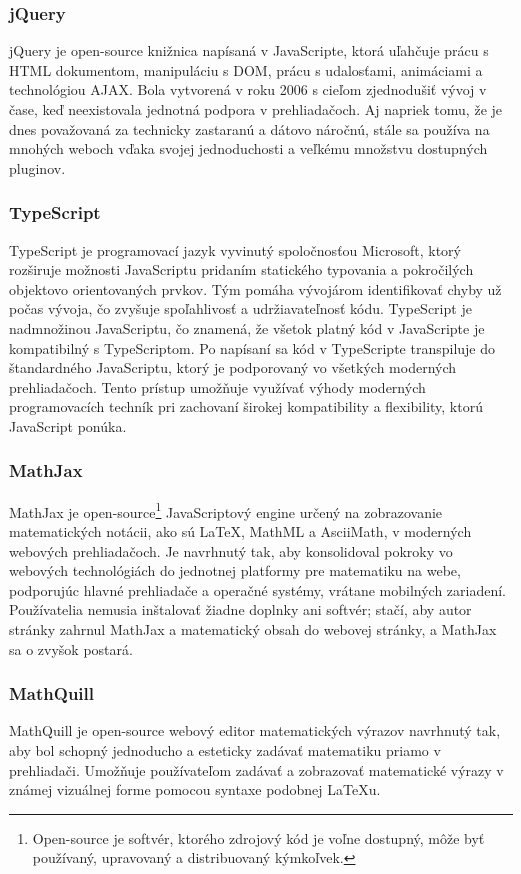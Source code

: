 \subsubsection{jQuery}
jQuery je open-source knižnica napísaná v JavaScripte, ktorá uľahčuje prácu s HTML dokumentom, manipuláciu s DOM, prácu s udalosťami, animáciami a technológiou AJAX.
 Bola vytvorená v roku 2006 s cieľom zjednodušiť vývoj v čase, keď neexistovala jednotná podpora v prehliadačoch.
  Aj napriek tomu, že je dnes považovaná za technicky zastaranú a dátovo náročnú, stále sa používa na mnohých weboch vďaka svojej jednoduchosti a veľkému množstvu dostupných pluginov.\cite{jquery}\cite{aipreklad}


 \subsubsection{TypeScript}
TypeScript je programovací jazyk vyvinutý spoločnosťou Microsoft, ktorý rozširuje možnosti JavaScriptu pridaním statického typovania a pokročilých objektovo orientovaných prvkov.
 Tým pomáha vývojárom identifikovať chyby už počas vývoja, čo zvyšuje spoľahlivosť a udržiavateľnosť kódu.
  TypeScript je nadmnožinou JavaScriptu, čo znamená, že všetok platný kód v JavaScripte je kompatibilný s TypeScriptom.
   Po napísaní sa kód v TypeScripte transpiluje do štandardného JavaScriptu, ktorý je podporovaný vo všetkých moderných prehliadačoch. 
   Tento prístup umožňuje využívať výhody moderných programovacích techník pri zachovaní širokej kompatibility a flexibility, ktorú JavaScript ponúka.\cite{TypeScript} 
\subsubsection{MathJax}
MathJax je open-source\footnote{Open-source je softvér, ktorého zdrojový kód je voľne dostupný, môže byť používaný, upravovaný a distribuovaný kýmkoľvek.} JavaScriptový engine určený na zobrazovanie matematických notácii, ako sú LaTeX, MathML a AsciiMath, v moderných webových prehliadačoch.
Je navrhnutý tak, aby konsolidoval pokroky vo webových technológiách do jednotnej platformy pre matematiku na webe, podporujúc hlavné prehliadače a operačné systémy, vrátane mobilných zariadení.
Používatelia nemusia inštalovať žiadne doplnky ani softvér; stačí, aby autor stránky zahrnul MathJax a matematický obsah do webovej stránky, a MathJax sa o zvyšok postará.\cite{MathJax}\cite{aipreklad}


  \subsubsection{MathQuill}
  MathQuill je open-source webový editor matematických výrazov navrhnutý tak, aby bol schopný jednoducho a esteticky zadávať matematiku priamo v prehliadači. 
  Umožňuje používateľom zadávať a zobrazovať matematické výrazy v známej vizuálnej forme pomocou syntaxe podobnej LaTeXu.

